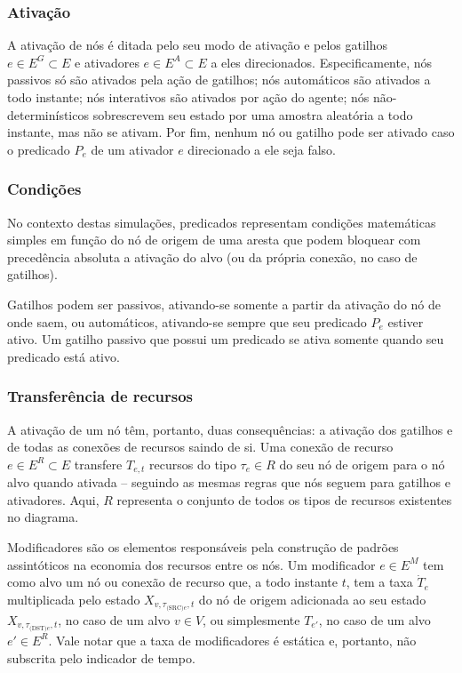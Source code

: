 \documentclass[conference]{IEEEtran}
\begin{document}
\subsubsection{Ativação}
A ativação de nós é ditada pelo seu modo de ativação e pelos gatilhos $e \in E^G \subset E$ e ativadores $e \in E^A \subset E$ a eles direcionados. Especificamente, nós passivos só são ativados pela ação de gatilhos; nós automáticos são ativados a todo instante; nós interativos são ativados por ação do agente; nós não-determinísticos sobrescrevem seu estado por uma amostra aleatória a todo instante, mas não se ativam. Por fim, nenhum nó ou gatilho pode ser ativado caso o predicado $P_e$ de um ativador $e$ direcionado a ele seja falso.

\subsubsection{Condições}
No contexto destas simulações, predicados representam condições matemáticas simples em função do nó de origem de uma aresta que podem bloquear com precedência absoluta a ativação do alvo (ou da própria conexão, no caso de gatilhos).

Gatilhos podem ser passivos, ativando-se somente a partir da ativação do nó de onde saem, ou automáticos, ativando-se sempre que seu predicado $P_e$ estiver ativo. Um gatilho passivo que possui um predicado se ativa somente quando seu predicado está ativo.

\subsubsection{Transferência de recursos}
A ativação de um nó têm, portanto, duas consequências: a ativação dos gatilhos e de todas as conexões de recursos saindo de si. Uma conexão de recurso $e \in E^R \subset E$ transfere $T_{e,t}$ recursos do tipo $\tau_e \in R$ do seu nó de origem para o nó alvo quando ativada -- seguindo as mesmas regras que nós seguem para gatilhos e ativadores. Aqui, $R$ representa o conjunto de todos os tipos de recursos existentes no diagrama.

Modificadores são os elementos responsáveis pela construção de padrões assintóticos na economia dos recursos entre os nós. Um modificador $e \in E^M$ tem como alvo um nó ou conexão de recurso que, a todo instante $t$, tem a taxa $\dot{T}_e$  multiplicada pelo estado $X_{v,\tau_{\text{(SRC)}e},t}$ do nó de origem adicionada ao seu estado $X_{v,\tau_{\text{(DST)}e},t}$, no caso de um alvo $v \in V$, ou simplesmente $T_{e'}$, no caso de um alvo $e' \in E^R$. Vale notar que a taxa de modificadores é estática e, portanto, não subscrita pelo indicador de tempo.
\end{document}
